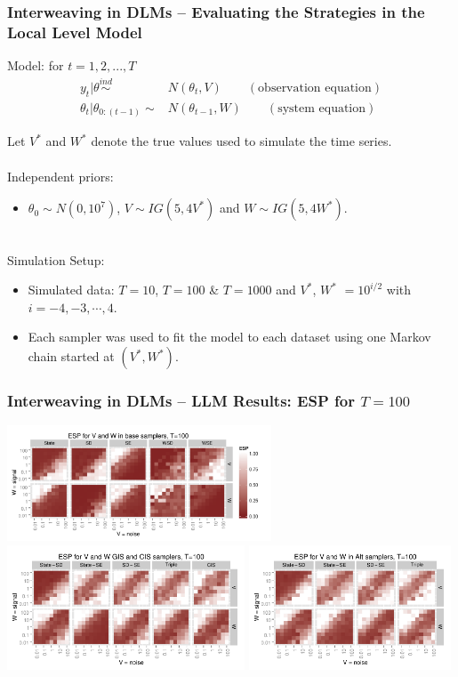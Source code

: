 \documentclass[xcolor=dvipsnames]{beamer}
\begin{document}
\begin{frame}[fragile]
\frametitle{Interweaving in DLMs -- Evaluating the Strategies in the Local Level Model}
Model: for $t=1,2,...,T$
\begin{align*}
    y_t|\theta  \stackrel{ind}{\sim}&N(\theta_t,V) \qquad (\mbox{observation equation})\\
    \theta_t|\theta_{0:(t-1)} \sim& N(\theta_{t-1},W) \qquad (\mbox{system equation})
  \end{align*} 

Let $V^*$ and $W^*$ denote the true values used to simulate the time series.\\~\\

Independent priors:
\begin{itemize}
\item $\theta_0\sim N(0, 10^7)$, $V\sim IG(5, 4V^*)$ and $W\sim IG(5, 4W^*)$.\\~\\
\end{itemize}

Simulation Setup:
\begin{itemize}
\item Simulated data: $T=10$, $T=100$ \& $T=1000$ and $V^*$, $W^*$ $=10^{i/2}$ with $i=-4,-3,\cdots,4$.
\item Each sampler was used to fit the model to each dataset using one Markov chain started at $(V^*,W^*)$.
\end{itemize}


\end{frame}

\begin{frame}
\frametitle{Interweaving in DLMs -- LLM Results: ESP for $T=100$}
\centering
\includegraphics[width=0.59\textwidth]{../dlmasis/doc/plots/basecisESplot100}\\
\includegraphics[width=0.53\textwidth]{../dlmasis/doc/plots/altintESplotV100}
\includegraphics[width=0.45\textwidth]{../dlmasis/doc/plots/altintESplotW100}
\end{frame}
\end{document}
